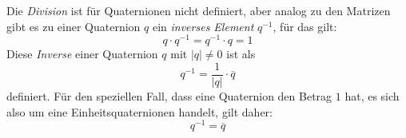 Die \emph{Division} ist für Quaternionen nicht definiert, aber analog zu den Matrizen gibt es zu einer Quaternion $q$ ein \emph{inverses Element} $q^{-1}$, für das gilt:
\begin{equation}
 q \cdot q^{-1} = q^{-1} \cdot q = 1
\end{equation}
Diese \emph{Inverse} einer Quaternion $q$ mit $\left|q\right| \neq 0$ ist als
\begin{equation}
 q^{-1} = \frac{1}{\left| q \right|} \cdot \overline{q}
\end{equation}
definiert. Für den speziellen Fall, dass eine Quaternion den Betrag $1$ hat, es sich also um eine Einheitsquaternionen handelt, gilt daher:
\begin{equation}
 q^{-1} = \overline{q}
\end{equation}